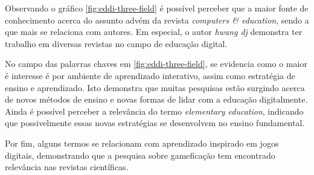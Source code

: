 Observando o gráfico \ref{fig:eddi-three-field} é possível perceber que a maior fonte de conhecimento acerca do assunto advém da revista \textit{computers & education}, sendo a que mais se relaciona com autores. Em especial, o autor \textit{hwang dj} demonstra ter trabalho em diversas revistas no campo de educação digital.

No campo das palavras chaves em \ref{fig:eddi-three-field}, se evidencia como o maior é interesse é por ambiente de aprendizado interativo, assim como estratégia de ensino e aprendizado. Isto demonstra que muitas pesquisas estão surgindo acerca de novos métodos de ensino e novas formas de lidar com a educação digitalmente. Ainda é possível perceber a relevância do termo \textit{elementary education}, indicando que possivelmente essas novas estratégias se desenvolvem no ensino fundamental.

Por fim, alguns termos se relacionam com aprendizado inspirado em jogos digitais, demonstrando que a pesquisa sobre gameficação tem encontrado relevância nas revistas científicas.



